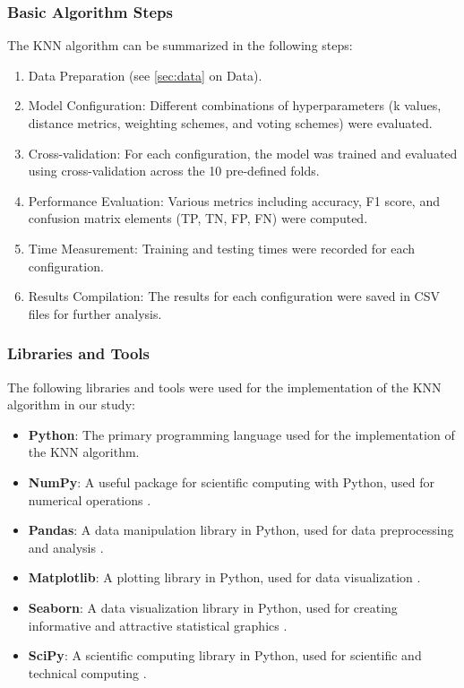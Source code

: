 \subsubsection*{Basic Algorithm Steps}
The KNN algorithm can be summarized in the following steps:
\begin{enumerate}
    \item Data Preparation (see \autoref{sec:data} on Data).
    \item Model Configuration: Different combinations of hyperparameters (k values, distance metrics, weighting schemes, and voting schemes) were evaluated.
    \item Cross-validation: For each configuration, the model was trained and evaluated using cross-validation across the 10 pre-defined folds.
    \item Performance Evaluation: Various metrics including accuracy, F1 score, and confusion matrix elements (TP, TN, FP, FN) were computed.
    \item Time Measurement: Training and testing times were recorded for each configuration.
    \item Results Compilation: The results for each configuration were saved in CSV files for further analysis.
\end{enumerate}

\subsubsection*{Libraries and Tools}
The following libraries and tools were used for the implementation of the KNN algorithm in our study:

\begin{itemize}
    \item \textbf{Python}: The primary programming language used for the implementation of the KNN algorithm.
    \item \textbf{NumPy}: A useful package for scientific computing with Python, used for numerical operations \cite{numpy}.
    \item \textbf{Pandas}: A data manipulation library in Python, used for data preprocessing and analysis \cite{pandas}.
    \item \textbf{Matplotlib}: A plotting library in Python, used for data visualization \cite{matplotlib}.
    \item \textbf{Seaborn}: A data visualization library in Python, used for creating informative and attractive statistical graphics \cite{seaborn}.
    \item \textbf{SciPy}: A scientific computing library in Python, used for scientific and technical computing \cite{scipy}.
\end{itemize}

